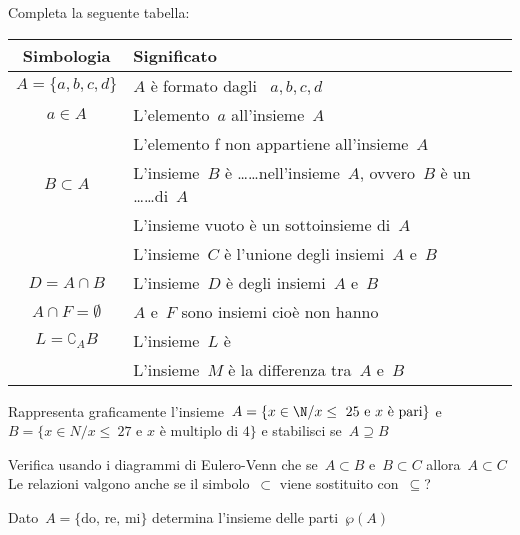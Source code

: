 \begin{esercizio}
\label{ese:7.67}
Completa la seguente tabella:

\begin{tabular*}{.9\textwidth}{@{\extracolsep{\fill}}*{2}{cl}}
\toprule
Simbologia & Significato\\
\midrule
\(A=\{a,b,c,d\}\) & \(A\) è formato dagli \dotfill~\(a, b, c, d\)\\
\(a\in A\) & L'elemento~\(a\) \dotfill all'insieme~\(A\)\\
\dotfill & L'elemento f non appartiene all'insieme~\(A\)\\
\(B\subset A\) & L'insieme~\(B\) è \ldots\ldots nell'insieme~\(A\), 
ovvero~\(B\) è un 
\ldots\ldots di~\(A\)\\
\dotfill & L'insieme vuoto è un sottoinsieme di~\(A\)\\
\dotfill & L'insieme~\(C\) è l'unione degli insiemi~\(A\) e~\(B\)\\
\(D=A\cap B\) & L'insieme~\(D\) è \dotfill degli insiemi~\(A\) e~\(B\)\\
\(A\cap F=\emptyset \)& \(A\) e~\(F\) sono insiemi \dotfill cioè non hanno 
\dotfill \\
\(L=\complement_{A}B\) & L'insieme~\(L\) è \dotfill \\
\dotfill & L'insieme~\(M\) è la differenza tra~\(A\) e~\(B\)\\
\bottomrule
\end{tabular*}
\end{esercizio}

\begin{esercizio}
\label{ese:7.68}
Rappresenta graficamente l'insieme~\(A=\{x\in \N/x\le~25 \text{ e } x\text{ è 
pari}\}\) e
\(B=\{x\in N/x\le~27\text{ e } x\text{ è multiplo di~4}\}\) e stabilisci 
se~\(A\supseteq B\)
\end{esercizio}

\begin{esercizio}
\label{ese:7.69}
Verifica usando i diagrammi di Eulero-Venn che se~\(A\subset B\) e~\(B\subset 
C\) 
allora~\(A\subset C\) Le relazioni valgono
anche se il simbolo~\({\subset}\) viene sostituito con~\({\subseteq}\)?
\end{esercizio}

\begin{esercizio}
\label{ese:7.70}
Dato~\(A=\{\text{do, re, mi}\}\) determina l'insieme delle parti~\(\wp (A)\)
\end{esercizio}


